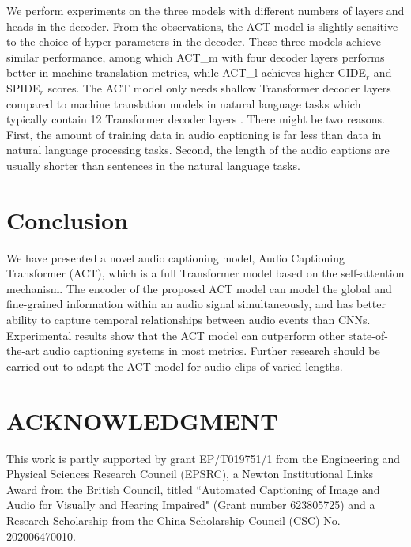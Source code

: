 \documentclass{article}
\begin{document}
\begin{sloppy}
We perform experiments on the three models with different numbers of layers and heads in the decoder. From the observations, the ACT model is slightly sensitive to the choice of hyper-parameters in the decoder. These three models achieve similar performance, among which ACT\_m with four decoder layers performs better in machine translation metrics, while ACT\_l achieves higher CIDE$_r$ and SPIDE$_r$ scores. The ACT model only needs shallow Transformer decoder layers compared to machine translation models in natural language tasks which typically contain \num{12} Transformer decoder layers \cite{vaswani2017attention}. There might be two reasons. First, the amount of training data in audio captioning is far less than data in natural language processing tasks. Second, the length of the audio captions are usually shorter than sentences in the natural language tasks.
\section{Conclusion}
\label{sec:conclusion}
We have presented a novel audio captioning model, Audio Captioning Transformer (ACT), which is a full Transformer model based on the self-attention mechanism. The encoder of the proposed ACT model can model the global and fine-grained information within an audio signal simultaneously, and has better ability to capture temporal relationships between audio events than CNNs. Experimental results show that the ACT model can outperform other state-of-the-art audio captioning systems in most metrics. Further research should be carried out to adapt the ACT model for audio clips of varied lengths.

\section{ACKNOWLEDGMENT}
\label{sec:ackn}
This work is partly supported by grant EP/T019751/1 from the Engineering and Physical Sciences Research Council (EPSRC), a Newton Institutional Links Award from the British Council, titled ``Automated Captioning of Image and Audio for Visually and Hearing Impaired" (Grant number 623805725) and a Research Scholarship from the China Scholarship Council (CSC) No. 202006470010. 




\end{sloppy}
\end{document}
